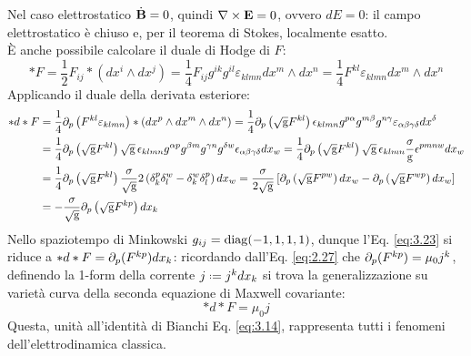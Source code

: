 Nel caso elettrostatico $ \dot{\mathbf{B}} = 0 $, quindi $ \nabla\times\mathbf{E} = 0 $, ovvero $ dE = 0 $: il campo elettrostatico è chiuso e, per il teorema di Stokes, localmente esatto.\\
È anche possibile calcolare il duale di Hodge di $ F $:
\begin{equation}
	*F = \frac{1}{2}F_{ij} * \left( dx^i \wedge dx^j \right) = \frac{1}{4} F_{ij} g^{ik} g^{il} \varepsilon_{klmn} dx^m \wedge dx^n = \frac{1}{4} F^{kl} \varepsilon_{klmn} dx^m \wedge dx^n
	\label{eq:3.22}
\end{equation}
Applicando il duale della derivata esteriore:
\begin{equation}
	\begin{split}
		*d*F &= \frac{1}{4} \partial_p \left( F^{kl} \varepsilon_{klmn} \right) * \left( dx^p \wedge dx^m \wedge dx^n \right) = \frac{1}{4} \partial_p \left( \sqrt{\mathrm{g}} F^{kl} \right) \epsilon_{klmn} g^{p\alpha} g^{m\beta} g^{n\gamma} \varepsilon_{\alpha\beta\gamma\delta} dx^{\delta}\\
		     &= \frac{1}{4} \partial_p \left( \sqrt{\mathrm{g}} F^{kl} \right) \sqrt{\mathrm{g}} \, \epsilon_{klmn} g^{\alpha p} g^{\beta m} g^{\gamma n} g^{\delta w} \epsilon_{\alpha\beta\gamma\delta} dx_w = \frac{1}{4} \partial_p \left( \sqrt{\mathrm{g}} F^{kl} \right) \sqrt{\mathrm{g}}\, \epsilon_{klmn} \frac{\sigma}{\mathrm{g}} \epsilon^{pmnw} dx_w\\
		     &= \frac{1}{4} \partial_p \left( \sqrt{\mathrm{g}} F^{kl} \right) \frac{\sigma}{\sqrt{\mathrm{g}}} 2 \left( \delta^p_k \delta^w_l - \delta^w_k \delta^p_l \right) dx_w = \frac{\sigma}{2\sqrt{\mathrm{g}}} \left[ \partial_p \left( \sqrt{\mathrm{g}} F^{pw} \right) dx_w - \partial_p \left( \sqrt{\mathrm{g}} F^{wp} \right) dx_w \right]\\
		     &= - \frac{\sigma}{\sqrt{\mathrm{g}}} \partial_p \left( \sqrt{\mathrm{g}} F^{kp} \right) dx_k
	\end{split}
	\label{eq:3.23}
\end{equation}
Nello spaziotempo di Minkowski $ g_{ij} = \operatorname{diag}(-1,1,1,1) $, dunque l'Eq. \ref{eq:3.23} si riduce a $ *d*F = \partial_p (F^{kp}) dx_k $: ricordando dall'Eq. \ref{eq:2.27} che $ \partial_p (F^{kp}) = \mu_0 j^k $, definendo la 1-form della corrente $ j \defeq j^k dx_k $ si trova la generalizzazione su varietà curva della seconda equazione di Maxwell covariante:
\begin{equation}
	*d*F = \mu_0 j
	\label{eq:3.24}
\end{equation}
Questa, unità all'identità di Bianchi Eq. \ref{eq:3.14}, rappresenta tutti i fenomeni dell'elettrodinamica classica.










